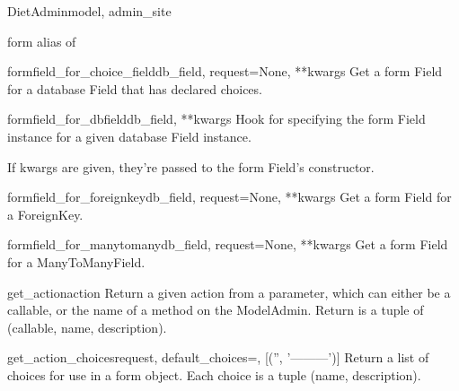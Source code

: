 \documentclass[letterpaper,10pt,english]{sphinxmanual}
\begin{document}
\begin{classdesc}{DietAdmin}{model, admin\_site}
\hypertarget{data.admin.DietAdmin.form}{}\begin{memberdesc}{form}
alias of 
\end{memberdesc}

\hypertarget{data.admin.DietAdmin.formfield_for_choice_field}{}\begin{methoddesc}{formfield\_for\_choice\_field}{db\_field, request=None, **kwargs}
Get a form Field for a database Field that has declared choices.
\end{methoddesc}

\hypertarget{data.admin.DietAdmin.formfield_for_dbfield}{}\begin{methoddesc}{formfield\_for\_dbfield}{db\_field, **kwargs}
Hook for specifying the form Field instance for a given database Field
instance.

If kwargs are given, they're passed to the form Field's constructor.
\end{methoddesc}

\hypertarget{data.admin.DietAdmin.formfield_for_foreignkey}{}\begin{methoddesc}{formfield\_for\_foreignkey}{db\_field, request=None, **kwargs}
Get a form Field for a ForeignKey.
\end{methoddesc}

\hypertarget{data.admin.DietAdmin.formfield_for_manytomany}{}\begin{methoddesc}{formfield\_for\_manytomany}{db\_field, request=None, **kwargs}
Get a form Field for a ManyToManyField.
\end{methoddesc}

\hypertarget{data.admin.DietAdmin.get_action}{}\begin{methoddesc}{get\_action}{action}
Return a given action from a parameter, which can either be a callable,
or the name of a method on the ModelAdmin.  Return is a tuple of
(callable, name, description).
\end{methoddesc}

\hypertarget{data.admin.DietAdmin.get_action_choices}{}\begin{methoddesc}{get\_action\_choices}{request, default\_choices=, {[}('', '---------'){]}}
Return a list of choices for use in a form object.  Each choice is a
tuple (name, description).
\end{methoddesc}


\end{classdesc}
\end{document}
